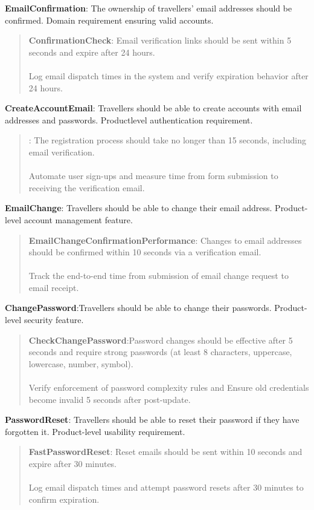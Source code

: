 \textbf{EmailConfirmation}: The ownership of travellers' email addresses should be confirmed. Domain requirement ensuring valid accounts.
    \begin{quote}
        \textbf{ConfirmationCheck}: Email verification links should be sent within 5 seconds and expire after 24 hours. \\ \\
        Log email dispatch times in the system and verify expiration behavior after 24 hours.
    \end{quote}
\textbf{CreateAccountEmail}: Travellers should be able to create accounts with email addresses and passwords. Productlevel authentication requirement.  
    \begin{quote}
        \textbf{}: The registration process should take no longer than 15 seconds, including email verification. \\ \\
        Automate user sign-ups and measure time from form submission to receiving the verification email.
    \end{quote}
\textbf{EmailChange}: Travellers should be able to change their email address. Product-level account management feature.
\begin{quote}
    \textbf{EmailChangeConfirmationPerformance}: Changes to email addresses should be confirmed within 10 seconds via a verification email.\\ \\
    Track the end-to-end time from submission of email change request to email receipt.
\end{quote}
\textbf{ChangePassword}:Travellers should be able to change their passwords. Product-level security feature.
    \begin{quote}
        \textbf{CheckChangePassword}:Password changes should be effective after 5 seconds and require strong passwords (at least 8 characters, uppercase, lowercase, number, symbol). \\ \\
        Verify enforcement of password complexity rules and Ensure old credentials become invalid 5 seconds after post-update.
    \end{quote}
\textbf{PasswordReset}: Travellers should be able to reset their password if they have forgotten it. Product-level usability requirement.
\begin{quote}
    \textbf{FastPasswordReset}: Reset emails should be sent within 10 seconds and expire after 30 minutes. \\ \\
    Log email dispatch times and attempt password resets after 30 minutes to confirm expiration.
\end{quote}
